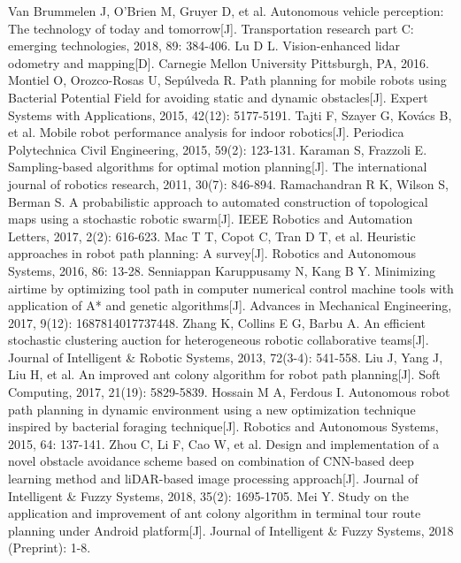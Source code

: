 \documentclass{iosart2c}
\begin{document}
\begin{thebibliography}{0}
 Van Brummelen J, O’Brien M, Gruyer D, et al. Autonomous vehicle perception: The technology of today and tomorrow[J]. Transportation research part C: emerging technologies, 2018, 89: 384-406.   
 Lu D L. Vision-enhanced lidar odometry and mapping[D]. Carnegie Mellon University Pittsburgh, PA, 2016.
Montiel O, Orozco-Rosas U, Sepúlveda R. Path planning for mobile robots using Bacterial Potential Field for avoiding static and dynamic obstacles[J]. Expert Systems with Applications, 2015, 42(12): 5177-5191.
Tajti F, Szayer G, Kovács B, et al. Mobile robot performance analysis for indoor robotics[J]. Periodica Polytechnica Civil Engineering, 2015, 59(2): 123-131.
Karaman S, Frazzoli E. Sampling-based algorithms for optimal motion planning[J]. The international journal of robotics research, 2011, 30(7): 846-894.
Ramachandran R K, Wilson S, Berman S. A probabilistic approach to automated construction of topological maps using a stochastic robotic swarm[J]. IEEE Robotics and Automation Letters, 2017, 2(2): 616-623.
Mac T T, Copot C, Tran D T, et al. Heuristic approaches in robot path planning: A survey[J]. Robotics and Autonomous Systems, 2016, 86: 13-28.
Senniappan Karuppusamy N, Kang B Y. Minimizing airtime by optimizing tool path in computer numerical control machine tools with application of A* and genetic algorithms[J]. Advances in Mechanical Engineering, 2017, 9(12): 1687814017737448.
Zhang K, Collins E G, Barbu A. An efficient stochastic clustering auction for heterogeneous robotic collaborative teams[J]. Journal of Intelligent \& Robotic Systems, 2013, 72(3-4): 541-558.
Liu J, Yang J, Liu H, et al. An improved ant colony algorithm for robot path planning[J]. Soft Computing, 2017, 21(19): 5829-5839.
Hossain M A, Ferdous I. Autonomous robot path planning in dynamic environment using a new optimization technique inspired by bacterial foraging technique[J]. Robotics and Autonomous Systems, 2015, 64: 137-141.
Zhou C, Li F, Cao W, et al. Design and implementation of a novel obstacle avoidance scheme based on combination of CNN-based deep learning method and liDAR-based image processing approach[J]. Journal of Intelligent \& Fuzzy Systems, 2018, 35(2): 1695-1705.
Mei Y. Study on the application and improvement of ant colony algorithm in terminal tour route planning under Android platform[J]. Journal of Intelligent \& Fuzzy Systems, 2018 (Preprint): 1-8.

\end{thebibliography}
\end{document}
